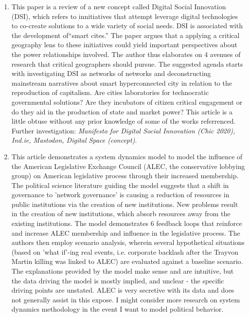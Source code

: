 \documentclass{article}
\begin{document}
\begin{enumerate}
\item \cite{certoma2020DigitalSocial}

This paper is a review of a new concept called Digital Social
Innovation (DSI), which refers to innitiatives that attempt leverage
digital technologies to co-create solutions to a wide variety of
social needs. DSI is associated with the development of``smart
cites.'' The paper argues that a applying a critical geography lens to
these initiatives could yield important perspectives about the power
relationships involved. The author thus elaborates on 4 avenues of
research that critical geographers should pursue. The suggested agenda
starts with investigating DSI as networks of networks and
deconstructing mainstream narratives about smart hyperconnected city
in relation to the reproduction of capitalism. Are cities laboratories
for technocratic governmental solutions? Are they incubators of
citizen critical engagement or do they aid in the production of state
and market power? This article is a little obtuse without any prior
knowledge of some of the works referrenced. Further investigation:
\emph{Manifesto for Digital Social Innovation (Chic 2020), Ind.ie,
Mastodon, Digital Space (concept)}.


\item \cite{andreasson2022ErodingPublic}

This article demonstrates a system dynamics model to model the
influence of the American Legislative Exchange Council (ALEC, the
conservative lobbying group) on American legislative process through
their increased membership. The political science literature guiding
the model suggests that a shift in governance to 'network governance'
is causing a reduction of resources in public institutions via the
creation of new institutions. New problems result in the creation of
new institutions, which absorb resources away from the existing
institutions. The model demonstrates 6 feedback loops that reinforce
and increase ALEC membership and influence in the legislative
process. The authors then employ scenario analysis, wherein several
hypothetical situations (based on 'what if'-ing real events,
i.e. corporate backlash after the Trayvon Martin killing was linked to
ALEC) are evaluated against a baseline scenario. The explanations
provided by the model make sense and are intuitive, but the data
driving the model is mostly implied, and unclear - the specific
driving points are unstated. ALEC is very secretive with its data and
does not generally assist in this expose. I might consider more
research on system dynamics methodology in the event I want to model
political behavior.


\end{enumerate}
\end{document}
